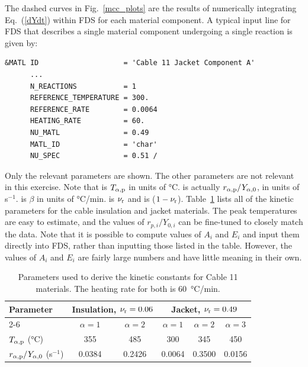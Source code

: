 \documentclass[11pt]{book}
\begin{document}
The dashed curves in Fig.~\ref{mcc_plots} are the results of numerically integrating Eq.~(\ref{dYdt}) within FDS for each material component. A typical input line for FDS that describes a single material component undergoing a single reaction is given by:
\begin{lstlisting}
&MATL ID                    = 'Cable 11 Jacket Component A'
      ...
      N_REACTIONS           = 1
      REFERENCE_TEMPERATURE = 300.
      REFERENCE_RATE        = 0.0064
      HEATING_RATE          = 60.
      NU_MATL               = 0.49
      MATL_ID               = 'char'
      NU_SPEC               = 0.51 /
\end{lstlisting}
Only the relevant parameters are shown. The other parameters are not relevant in this exercise. Note that  is $T_{\alpha,{\rm p}}$ in units of \unit{\degreeCelsius}.  is actually $r_{\alpha,{\rm p}}/Y_{\alpha,0}$, in units of s$^{-1}$.  is $\beta$ in units of \unit{\degreeCelsius}/min.  is $\nu_{\rm r}$ and  is ($1-\nu_{\rm r}$). Table~\ref{cable_parameters} lists all of the kinetic parameters for the cable insulation and jacket materials. The peak temperatures are easy to estimate, and the values of $r_{p,i}/Y_{0,i}$ can be fine-tuned to closely match the data. Note that it is possible to compute values of $A_i$ and $E_i$ and input them directly into FDS, rather than inputting those listed in the table. However, the values of $A_i$ and $E_i$ are fairly large numbers and have little meaning in their own.

\begin{table}[!htb]
\centering
\caption[Parameters for kinetic constants for cable materials]{Parameters used to derive the kinetic constants for Cable 11 materials. The heating rate for both is 60~\unit{\degreeCelsius}/min.}
\label{cable_parameters}
\begin{tabular}{|l||c|c||c|c|c|}
\hline
Parameter                                       & \multicolumn{2}{|c||}{Insulation, $\nu_{\rm r}=0.06$ } &  \multicolumn{3}{|c|}{Jacket, $\nu_{\rm r}=0.49$}     \\ \cline{2-6}
                                                & $\alpha=1$    & $\alpha=2$                             &  $\alpha=1$  & $\alpha=2$   & $\alpha=3$              \\ \hline \hline
$T_{\alpha,{\rm p}}$ (\unit{\degreeCelsius})           & 355           & 485                                    &  300         & 345          & 450                     \\ \hline
$r_{\alpha,{\rm p}}/Y_{\alpha,0}$ (s$^{-1}$)    & 0.0384        & 0.2426                                 &  0.0064      & 0.3500       & 0.0156                  \\ \hline
\end{tabular}
\end{table}
\end{document}
